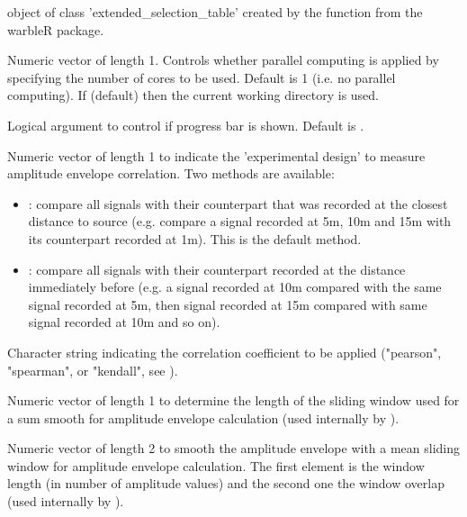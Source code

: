 \documentclass[letterpaper]{book}
\begin{document}
\begin{Arguments}
\begin{ldescription}
\item[\code{X}] object of class 'extended\_selection\_table' created by the function  from the warbleR package.

\item[\code{parallel}] Numeric vector of length 1. Controls whether parallel computing is applied by specifying the number of cores to be used. Default is 1 (i.e. no parallel computing).
If  (default) then the current working directory is used.

\item[\code{pb}] Logical argument to control if progress bar is shown. Default is .

\item[\code{method}] Numeric vector of length 1 to indicate the 'experimental design' to measure amplitude envelope correlation. Two methods are available:
\begin{itemize}

\item{} : compare all signals with their counterpart that was recorded at the closest distance to source (e.g. compare a signal recorded at 5m, 10m and 15m with its counterpart recorded at 1m). This is the default method. 
\item{} : compare all signals with their counterpart recorded at the distance immediately before (e.g. a signal recorded at 10m compared with the same signal recorded at 5m, then signal recorded at 15m compared with same signal recorded at 10m and so on).

\end{itemize}


\item[\code{cor.method}] Character string indicating the correlation coefficient to be applied ("pearson", "spearman", or "kendall", see ).

\item[\code{ssmooth}] Numeric vector of length 1 to determine the length of the sliding window used for a sum smooth for amplitude envelope calculation (used internally by ).

\item[\code{msmooth}] Numeric vector of length 2 to smooth the amplitude envelope with a mean sliding window for amplitude envelope calculation. The first element is the window length (in number of amplitude values) and the second one the window overlap (used internally by ).


\end{ldescription}
\end{Arguments}
\end{document}
